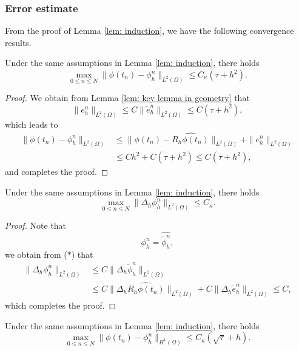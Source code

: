 \documentclass{siamart250211}
\begin{document}
\subsubsection{Error estimate}

From the proof of Lemma \ref{lem: induction}, we have the following convergence results.
\begin{theorem}\label{thm: L2 convergence}
	Under the same assumptions in Lemma \ref{lem: induction}, there holds
	\begin{equation*}
		\max_{0 \le n \le N} \|\phi(t_n) - \phi_h^n\|_{L^2(\Omega)} \le C_{\kappa}(\tau + h^2).
	\end{equation*}
\end{theorem}
\begin{proof}
	We obtain from Lemma \ref{lem: key lemma in geometry} that
	\begin{equation*}
		\|e_h^n\|_{L^2(\Omega)} \le C \|\tilde{e}_h^n\|_{L^2(\Omega)} \le C(\tau + h^2),
	\end{equation*}
    which leads to
	\begin{align*}
		\|\phi(t_n) - \phi_h^n\|_{L^2(\Omega)} & \le \|\phi(t_n) - \widehat{R_h\phi(t_n)}\|_{L^2(\Omega)} +  \|e_h^n\|_{L^2(\Omega)} \\
		& \le C h^2 + C(\tau + h^2) \le C(\tau + h^2),
	\end{align*}
	and completes the proof.
\end{proof}
\begin{theorem}
	Under the same assumptions in Lemma \ref{lem: induction}, there holds
	\begin{equation*}
		\max_{0 \le n \le N}\|\Delta_h \phi_h^n\|_{L^2(\Omega)} \le C_{\kappa}.
	\end{equation*}
\end{theorem}
\begin{proof}
	Note that 
	\begin{equation*}
		\phi_h^n = \widehat{\tilde{\phi}_h^n},
	\end{equation*}
	we obtain from ($*$) that
	\begin{align*}
		\|\Delta_h \phi_h^n\|_{L^2(\Omega)} &\le C \|\Delta_h \tilde{\phi}_h^n\|_{L^2(\Omega)} \\
		& \le C \|\Delta_h \widehat{R_h\phi(t_n)}\|_{L^2(\Omega)} + C \|\Delta_h \tilde{e}_h^n\|_{L^2(\Omega)} \le C,
	\end{align*}
	which completes the proof.
\end{proof}
\begin{corollary}\label{thm: H1 convergence}
	Under the same assumptions in Lemma \ref{lem: induction}, there holds
	\begin{equation*}
		\max_{0 \le n \le N} \|\phi(t_n) - \phi_h^n\|_{H^1(\Omega)} \le C_{\kappa} (\sqrt{\tau} + h).
	\end{equation*}
\end{corollary}
\end{document}
